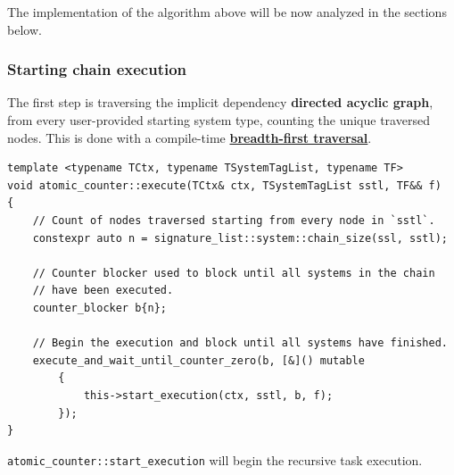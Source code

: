 \documentclass[twoside, 12pt, a4paper, openright]{book}
\begin{document}
\begin{algorithm}[H]
{        
        \F{\SystemOf{\T}}\;
        \DecrementAtomicCounter{\RemainingSystems}\;
        \BlankLine


    }
    \KwEnd

\end{algorithm}

The implementation of the algorithm above will be now analyzed in the
sections below.

\hypertarget{mt_s_sce}{\subsubsection{Starting chain
execution}\label{mt_s_sce}}

The first step is traversing the implicit dependency \textbf{directed
acyclic graph}, from every user-provided starting system type, counting
the unique traversed nodes. This is done with a compile-time
\protect\hyperlink{appendix_compiletime_bfs}{\textbf{breadth-first
traversal}}.

\begin{verbatim}
template <typename TCtx, typename TSystemTagList, typename TF>
void atomic_counter::execute(TCtx& ctx, TSystemTagList sstl, TF&& f)
{
    // Count of nodes traversed starting from every node in `sstl`.
    constexpr auto n = signature_list::system::chain_size(ssl, sstl);

    // Counter blocker used to block until all systems in the chain
    // have been executed.
    counter_blocker b{n};

    // Begin the execution and block until all systems have finished.
    execute_and_wait_until_counter_zero(b, [&]() mutable
        {
            this->start_execution(ctx, sstl, b, f);
        });
}
\end{verbatim}

\texttt{atomic_counter::start_execution}
will begin the recursive task execution.
\end{document}
